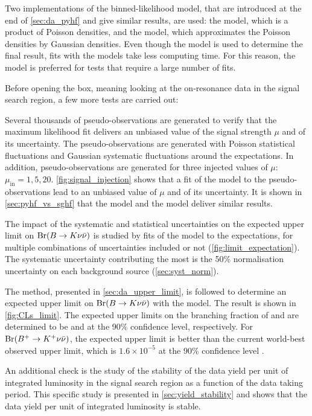 Two implementations of the binned-likelihood model, that are introduced at the end of \cref{sec:da_pyhf} and give similar results, are used: the \pyhf model, which is a product of Poisson densities, and the \sghf model, which approximates the Poisson densities by Gaussian densities.
Even though the \pyhf model is used to determine the final result, fits with the \sghf models take less computing time.
For this reason, the \sghf model is preferred for tests that require a large number of fits.

Before opening the box, meaning looking at the on-resonance data in the signal search region, a few more tests are carried out:
\bi
\item Several thousands of pseudo-observations are generated to verify that the maximum likelihood fit delivers an unbiased value of the signal strength $\mu$ and of its uncertainty.
The pseudo-observations are generated with Poisson statistical fluctuations and Gaussian systematic fluctuations around the expectations.
In addition, pseudo-observations are generated for three injected values of $\mu$: $\mu_{\mathrm{in}}=1,5,20$.
\cref{fig:signal_injection} shows that a fit of the \sghf model to the pseudo-observations lead to an unbiased value of $\mu$ and of its uncertainty.
It is shown in \cref{sec:pyhf_vs_sghf} that the \pyhf model and the \sghf model deliver similar results.
\item The impact of the systematic and statistical uncertainties on the expected upper limit on $\mathrm{\mathrm{Br}}(B\rightarrow K\nu\bar{\nu})$ is studied by fits of the \sghf model to the expectations, for multiple combinations of uncertainties included or not (\cref{fig:limit_expectation}).
The systematic uncertainty contributing the most is the 50\% normalisation uncertainty on each background source (\cref{sec:syst_norm}).
\item The \CLs method, presented in \cref{sec:da_upper_limit}, is followed to determine an expected upper limit on $\mathrm{\mathrm{Br}}(B\rightarrow K\nu\bar{\nu})$ with the \pyhf model.
The result is shown in \cref{fig:CLs_limit}.
The expected upper limits on the branching fraction of \BKpnn and \BKznn are determined to be \limitKp and \limitKz at the 90\% confidence level, respectively.
For $\mathrm{\mathrm{Br}}(B^+\rightarrow K^+\nu\bar{\nu})$, the expected upper limit is better than the current world-best observed upper limit, which is $1.6\times10^{-5}$ at the 90\% confidence level \cite{ParticleDataGroup:2020ssz}.
\item An additional check is the study of the stability of the data yield per unit of integrated luminosity in the signal search region as a function of the data taking period.
This specific study is presented in \cref{sec:yield_stability} and shows that the data yield per unit of integrated luminosity is stable.
\ei

